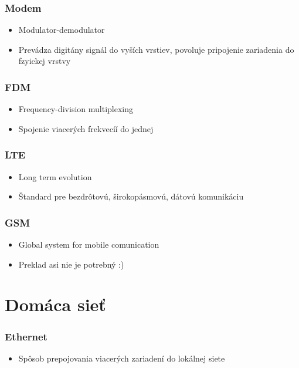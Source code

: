 \documentclass[10pt,xcolor=pdflatex,hyperref={unicode}]{beamer}
\begin{document}
    \begin{frame}
        \frametitle{Modem}
        \begin{itemize}
            \item Modulator-demodulator
            \item Prevádza digitány signál do vyších vrstiev, povoluje pripojenie zariadenia do fzyickej vrstvy
        \end{itemize}
    \end{frame}

    \begin{frame}
        \frametitle{FDM}
        \begin{itemize}
            \item Frequency-division multiplexing
            \item Spojenie viacerých frekvecíí do jednej
        \end{itemize}
    \end{frame}

    \begin{frame}
        \frametitle{LTE}
        \begin{itemize}
            \item Long term evolution
            \item Štandard pre bezdrôtovú, širokopásmovú, dátovú komunikáciu
        \end{itemize}
    \end{frame}

    \begin{frame}
        \frametitle{GSM}
        \begin{itemize}
            \item Global system for mobile comunication
            \item Preklad asi nie je potrebný :)
        \end{itemize}
    \end{frame}


    \section{Domáca sieť}
    \begin{frame}
        \frametitle{Ethernet}
        \begin{itemize}
            \item Spôsob prepojovania viacerých zariadení do lokálnej siete
        \end{itemize}
    \end{frame}
\end{document}
